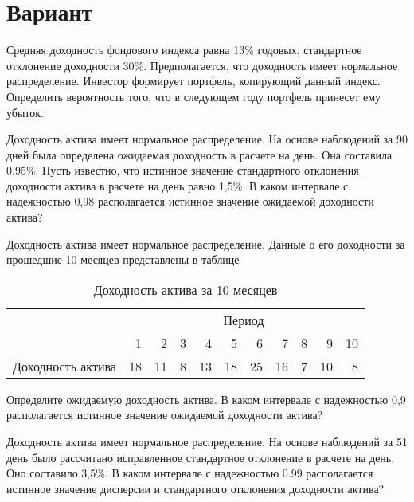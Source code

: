 \documentclass[12pt,a4paper]{article}
\begin{document}
\section{Вариант}
\begin{taskrus}
Средняя доходность фондового индекса равна 13\% годовых, стандартное отклонение доходности 30\%. Предполагается, что доходность имеет нормальное распределение. Инвестор формирует портфель, копирующий данный индекс. Определить вероятность того, что в следующем году портфель принесет ему убыток.
\end{taskrus}

\begin{taskrus}
Доходность актива имеет нормальное распределение. На основе наблюдений за 90 дней была определена ожидаемая доходность в расчете на день. Она составила 0.95\%. Пусть известно, что истинное значение стандартного отклонения доходности актива в расчете на день равно 1,5\%. В каком интервале с надежностью 0,98 располагается истинное значение ожидаемой доходности актива?
\end{taskrus}

\begin{taskrus}
Доходность актива имеет нормальное распределение. Данные о его доходности за прошедшие 10 месяцев представлены в таблице
\begin{table}[H]
  \centering
  \caption{Доходность актива за 10 месяцев}
    \begin{tabular}{lrrrrrrrrrr}
    \toprule
    \multicolumn{1}{c}{} & \multicolumn{10}{c}{Период} \\\cmidrule{2-11}
    \multicolumn{1}{c}{} & 1     & 2     & 3     & 4     & 5     & 6     & 7     & 8     & 9     & 10 \\
    \midrule
    \multicolumn{1}{l}{Доходность актива} & 18    & 11    & 8     & 13    & 18    & 25    & 16    & 7     & 10    & 8 \\
    \bottomrule
    \end{tabular}%
  \label{tab:addlabel}%
\end{table}%
Определите ожидаемую доходность актива. В каком интервале с надежностью 0,9 располагается истинное значение ожидаемой доходности актива?

\end{taskrus}

\begin{taskrus}
Доходность актива имеет нормальное распределение. На основе наблюдений за 51 день было рассчитано исправленное стандартное отклонение в расчете на день. Оно составило 3,5\%. В каком интервале с надежностью 0.99 располагается истинное значение дисперсии и стандартного отклонения доходности актива?
\end{taskrus}
\end{document}
